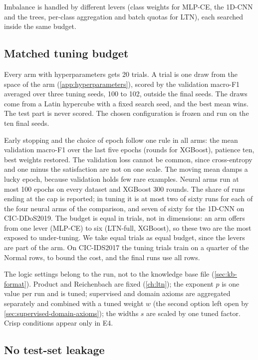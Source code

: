 Imbalance is handled by different levers (class weights for MLP-CE, the 1D-CNN and the trees,
per-class aggregation and batch quotas for LTN), each searched inside the same budget.

\subsection{Matched tuning budget}
\label{sec:matched-tuning}

Every arm with hyperparameters gets 20 trials. A trial is one draw from the space of the arm
(\cref{app:hyperparameters}), scored by the validation macro-F1 averaged over three tuning
seeds, 100 to 102, outside the final seeds. The draws come from a Latin hypercube with a fixed
search seed, and the best mean wins. The test part is never scored. The chosen configuration is
frozen and run on the ten final seeds.

Early stopping and the choice of epoch follow one rule in all arms: the mean validation macro-F1
over the last five epochs (rounds for XGBoost), patience ten, best weights restored. The
validation loss cannot be common, since cross-entropy and one minus the satisfaction are not on
one scale. The moving mean damps a lucky epoch, because validation holds few rare examples.
Neural arms run at most 100 epochs on every dataset and XGBoost 300 rounds. The share of runs
ending at the cap is reported; in tuning it is at most two of sixty runs for each of the four
neural arms of the comparison, and seven of sixty for the 1D-CNN on CIC-DDoS2019.
The budget is equal in trials, not in dimensions: an arm offers from one lever (MLP-CE) to six
(LTN-full, XGBoost), so these two are the most exposed to under-tuning. We take equal trials as
equal budget, since the levers are part of the arm. On CIC-IDS2017 the tuning trials train on a
quarter of the Normal rows, to bound the cost, and the final runs use all rows.

The logic settings belong to the run, not to the knowledge base file (\cref{sec:kb-format}).
Product and Reichenbach are fixed (\cref{ch:ltn}); the exponent $p$ is one value per run and is
tuned; supervised and domain axioms are aggregated separately and combined with a tuned weight
$w$ (the second option left open by \cref{sec:supervised-domain-axioms}); the widths $s$ are
scaled by one tuned factor. Crisp conditions appear only in E4.

\subsection{No test-set leakage}
\label{sec:no-leakage}

